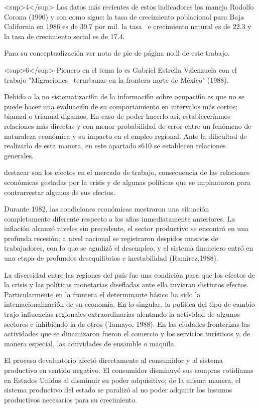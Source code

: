 \documentclass{article}
\begin{document}
<sup>4</sup> Los datos más recientes de estos indicadores los maneja Rodolfo Corona (1990) y son como sigue: la tasa de crecimiento poblacional para Baja California en 1986 es de 39.7 por mil. la tasa ~e crecimiento natural es de 22.3 y la tasa de crecimiento social es de 17.4.

Para su conceptualización ver nota de pie de página no.ll de este trabajo.

<sup>6</sup> Pionero en el tema lo es Gabriel Estrella Valenzuela con el trabajo "Migraciones ~terurbanas en la frontera norte de México" (1988).

Debido a la no sistematizaci6n de la informaci6n sobre ocupaci6n es que no se puede hacer una evaluaci6n de su comportamiento en intervalos más cortos; bianual o trianual digamos. En caso de poder hacerlo así, estableceríamos relaciones más directas y con menor probabilidad de error entre un fenómeno de naturaleza económica y su impacto en el empleo regional. Ante la dificultad de realizarlo de esta manera, en este apartado s610 se establecen relaciones generales.

destacar son los efectos en el mercado de trabajo, consecuencia de las relaciones económicas gestadas por la crisis y de algunas políticas que se implantaron para contrarrestar algunos de sus efectos.

Durante 1982, las condiciones económicas mostraron una situación completamente diferente respecto a los afias inmediatamente anteriores. La inflación alcanzó niveles sin precedente, el sector productivo se encontró en una profunda recesión; a nivel nacional se registraron despidos masivos de trabajadores, con lo que se agudizó el desempleo, y el sistema financiero entró en una etapa de profundos desequilibrios e inestabilidad (Ramírez,1988).

La diversidad entre las regiones del país fue una condición para que los efectos de la crisis y las políticas monetarias disefladas ante ella tuvieran distintos efectos. Particularmente en la frontera el determinante básico ha sido la intemacionalización de su economía. En lo singular, la política del tipo de cambio trajo influencias regionales extraordinarias alentando la actividad de algunos sectores e inhibiendo la de otros (Tamayo, 1988). En las ciudades fronterizas las actividades que se dinamizaron fueron el comercio y los servicios turísticos y, de manera especial, las actividades de ensamble o maquila.

El proceso devaluatorio afectó directamente al consumidor y al sistema productivo en sentido negativo. El consumidor disminuyó sus compras cotidianas en Estados Unidos al disminuir su poder adquisitivo; de la misma manera, el sistema productivo del estado se paralizó al no poder adquirir los insumos productivos necesarios para su crecimiento.
\end{document}

